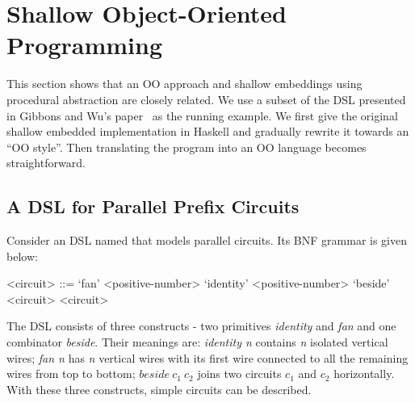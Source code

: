 \section{Shallow Object-Oriented Programming}\label{sec:oo}

\begin{comment}
Weixin writes this part.

Argue that shallow embeddings and straightforward OO 
programs are essentially the same thing. 

Start from a simple shallow DSL in Haskell, 
and iterate throught it until you reach a form 
that looks like an OO program.

Show how todo transformations in Shallow embeddings
using the insight of how to do transformations in OO
programs.

Show the correponding Java programs and the Java program 
with transformation that we can port back to Haskell.
\end{comment}

This section shows that an OO approach and shallow embeddings using
procedural abstraction are closely related.  We use a subset of the
DSL presented in Gibbons and Wu's paper~\cite{gibbons2014folding} as
the running example.  We first give the original shallow embedded
implementation in Haskell and gradually rewrite it towards an ``OO
style''.  Then translating the program into an OO language becomes
straightforward.

\subsection{A DSL for Parallel Prefix Circuits}
Consider an DSL named \dsl that models parallel circuits.
Its BNF grammar is given below:
\setlength{\grammarindent}{5em} %

\begin{grammar}
<circuit> ::= `fan' <positive-number>
\alt `identity' <positive-number>
\alt `beside' <circuit> <circuit>
\end{grammar}

The DSL consists of three constructs - two primitives
\emph{identity} and \emph{fan} and one combinator \emph{beside}.
Their meanings are: \emph{identity n} contains \emph{n} isolated vertical wires;
\emph{fan n} has \emph{n} vertical wires with its first wire connected to
all the remaining wires from top to bottom; $beside\ c_1\ c_2$ joins two circuits
$c_1$ and $c_2$ horizontally.
With these three constructs, simple circuits can be described.

